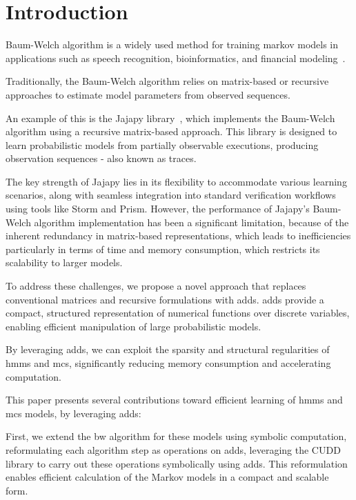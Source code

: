 
\section{Introduction}\label{sec:introduction}
 Baum-Welch algorithm is a widely used method for training markov models in applications such as speech recognition, bioinformatics, and financial modeling~\cite{chavan2013overview,ciocchetta2009bio,mamon2007hidden}.

Traditionally, the Baum-Welch algorithm relies on matrix-based or recursive approaches to estimate model parameters from observed sequences.

An example of this is the Jajapy library~\cite{ReynouardIB23}, which implements the Baum-Welch algorithm using a recursive matrix-based approach.
This library is designed to learn probabilistic models from partially observable executions, producing observation sequences - also known as traces.

The key strength of Jajapy lies in its flexibility to accommodate various learning scenarios, along with seamless integration into standard verification workflows using tools like Storm and Prism.
However, the performance of Jajapy's Baum-Welch algorithm implementation has been a significant limitation, because of the inherent redundancy in matrix-based representations, which leads to inefficiencies particularly in terms of time and memory consumption, which restricts its scalability to larger models.

To address these challenges, we propose a novel approach that replaces conventional matrices and recursive formulations with \glspl{add}.
\glspl{add} provide a compact, structured representation of numerical functions over discrete variables, enabling efficient manipulation of large probabilistic models.

By leveraging \glspl{add}, we can exploit the sparsity and structural regularities of \glspl{hmm} and \glspl{mc}, significantly reducing memory consumption and accelerating computation.

This paper presents several contributions toward efficient learning of \glspl{hmm} and \glspl{mc} models, by leveraging \glspl{add}:

First, we extend the \gls{bw} algorithm for these models using symbolic computation, reformulating each algorithm step as operations on \glspl{add}, leveraging the CUDD library to carry out these operations symbolically using \glspl{add}.
This reformulation enables efficient calculation of the Markov models in a compact and scalable form.


